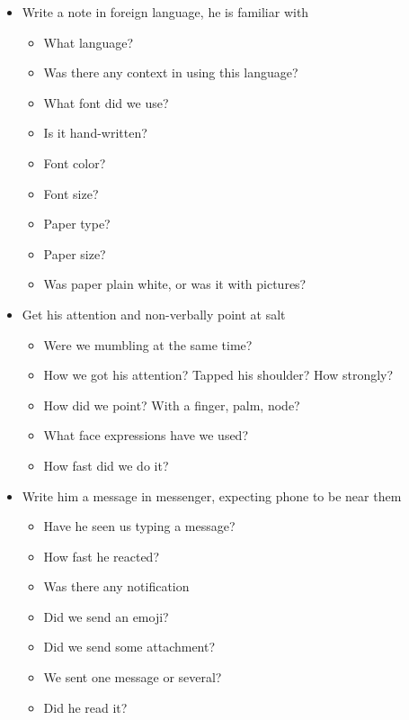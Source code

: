 \documentclass[../../what-is-computer.tex]{subfiles}
\begin{document}
\begin{itemize}
        \item Write a note in foreign language, he is familiar with
        \begin{itemize}
            \item What language?
            \item Was there any context in using this language?
            \item What font did we use?
            \item Is it hand-written?
            \item Font color?
            \item Font size?
            \item Paper type?
            \item Paper size?
            \item Was paper plain white, or was it with pictures?
        \end{itemize}

        \item Get his attention and non-verbally point at salt
        \begin{itemize}
            \item Were we mumbling at the same time?
            \item How we got his attention? Tapped his shoulder? How strongly?
            \item How did we point? With a finger, palm, node?
            \item What face expressions have we used?
            \item How fast did we do it? 
        \end{itemize}

        \item Write him a message in messenger, expecting phone to be near them
        \begin{itemize}
            \item Have he seen us typing a message?
            \item How fast he reacted?
            \item Was there any notification
            \item Did we send an emoji?
            \item Did we send some attachment?
            \item We sent one message or several?
            \item Did he read it?
        \end{itemize}


\end{itemize}
\end{document}
